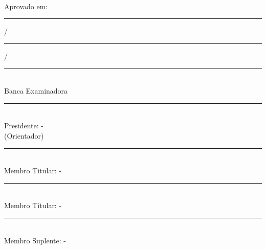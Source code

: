 \begin{titlepage}
  \begin{center}
    \bf{\MakeUppercase{
      \large{\autor}\\
      \vspace*{1cm}
      \small{
        \titulo\\
        \subtitulo\\
      }
    }}
  \end{center}
  \vspace*{1cm}
  \begin{addmargin}[5cm]{0cm}
    \justify{
      \hspace*{.5cm} \natureza\\
    }
  \end{addmargin}
  \vspace*{0.5cm}
  \begin{center}
    Aprovado em: \rule{1cm}{0.1pt} / \rule{1cm}{0.1pt} / \rule{1cm}{0.1pt}\\
    \vspace*{0.5cm}
    Banca Examinadora\\
    \vspace*{0.5cm}
    \rule{\textwidth}{0.1pt}\\
    Presidente: \orientador - \instituicaoorientador\\
    (Orientador)\\
    \vspace*{0.5cm}
    \rule{\textwidth}{0.1pt}\\
    Membro Titular: \membrotitularum - \instituicaomembrotitularum\\
    \vspace*{0.5cm}
    \rule{\textwidth}{0.1pt}\\
    Membro Titular: \membrotitulardois - \instituicaomembrotitulardois\\
    \vspace*{0.5cm}
    \rule{\textwidth}{0.1pt}\\
    Membro Suplente: \membrosuplente - \instituicaomembrosuplente\\
    \vspace*{0.5cm}
    \large{\bf{\MakeUppercase{
      \local\\
      \data\\
    }}}
  \end{center}
\end{titlepage}
